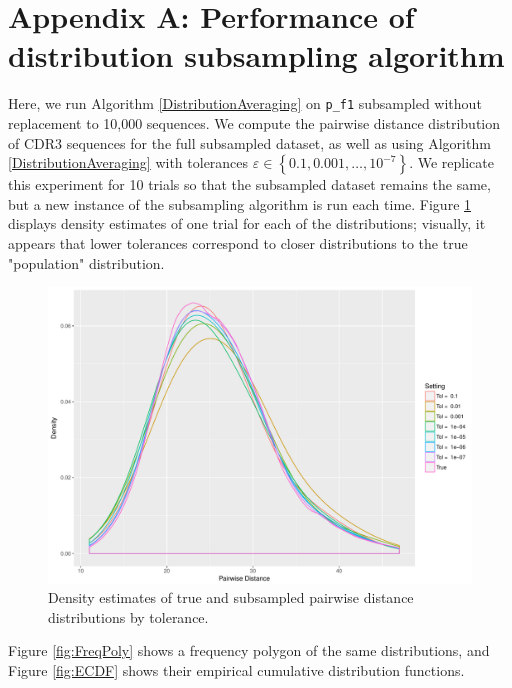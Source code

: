 \documentclass{article}
\begin{document}



\section*{Appendix A: Performance of distribution subsampling algorithm}
Here, we run Algorithm \ref{DistributionAveraging} on \texttt{p\_f1} subsampled without replacement to 10,000 sequences.
We compute the pairwise distance distribution of CDR3 sequences for the full subsampled dataset, as well as using Algorithm \ref{DistributionAveraging} with tolerances $\varepsilon \in \left\{0.1, 0.001, \dotsc, 10^{-7} \right\}$.
We replicate this experiment for 10 trials so that the subsampled dataset remains the same, but a new instance of the subsampling algorithm is run each time.
Figure \ref{fig:Distributions} displays density estimates of one trial for each of the distributions; visually, it appears that lower tolerances correspond to closer distributions to the true "population" distribution.
\begin{figure}
    \includegraphics[width=\linewidth]{Figures/density_by_tol.pdf}
    \caption{Density estimates of true and subsampled pairwise distance distributions by tolerance.}
    \label{fig:Distributions}
\end{figure}
Figure \ref{fig:FreqPoly} shows a frequency polygon of the same distributions, and Figure \ref{fig:ECDF} shows their empirical cumulative distribution functions.
\end{document}
